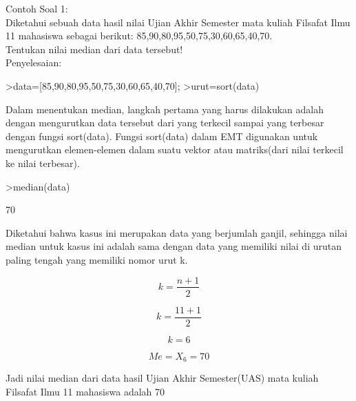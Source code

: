 \documentclass[a4paper,10pt]{article}
\begin{document}
\begin{eulernotebook}
\begin{eulercomment}
Contoh Soal 1:\\
Diketahui sebuah data hasil nilai Ujian Akhir Semester mata kuliah
Filsafat Ilmu 11 mahasiswa sebagai berikut:
85,90,80,95,50,75,30,60,65,40,70.\\
Tentukan nilai median dari data tersebut!\\
Penyelesaian:
\end{eulercomment}
\begin{eulerprompt}
>data=[85,90,80,95,50,75,30,60,65,40,70];
>urut=sort(data)
\end{eulerprompt}
\begin{euleroutput}
  [30,  40,  50,  60,  65,  70,  75,  80,  85,  90,  95]
\end{euleroutput}
\begin{eulercomment}
Dalam menentukan median, langkah pertama yang harus dilakukan adalah
dengan mengurutkan data tersebut dari yang terkecil sampai yang
terbesar dengan fungsi sort(data). Fungsi sort(data) dalam EMT
digunakan untuk mengurutkan elemen-elemen dalam suatu vektor atau
matriks(dari nilai terkecil ke nilai terbesar).
\end{eulercomment}
\begin{eulerprompt}
>median(data)
\end{eulerprompt}
\begin{euleroutput}
  70
\end{euleroutput}
\begin{eulercomment}
Diketahui bahwa kasus ini merupakan data yang berjumlah ganjil,
sehingga nilai median untuk kasus ini adalah sama dengan data yang
memiliki nilai di urutan paling tengah yang memiliki nomor urut k.\\
\end{eulercomment}
\begin{eulerformula}
\[
k = \frac{n+1}{2}
\]
\end{eulerformula}
\begin{eulerformula}
\[
k = \frac{11+1}{2}
\]
\end{eulerformula}
\begin{eulerformula}
\[
k = 6
\]
\end{eulerformula}
\begin{eulerformula}
\[
Me = X_6 = 70
\]
\end{eulerformula}
\begin{eulercomment}
Jadi nilai median dari data hasil Ujian Akhir Semester(UAS) mata
kuliah Filsafat Ilmu 11 mahasiswa adalah 70


\end{eulercomment}
\end{eulernotebook}
\end{document}
